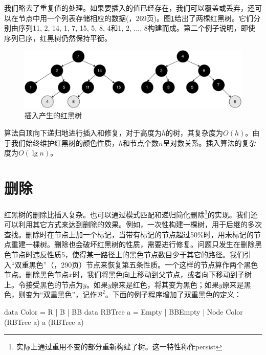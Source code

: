 \documentclass[b5paper]{ctexart}
\begin{document}
我们略去了重复值的处理。如果要插入的值已经存在，我们可以覆盖或丢弃，还可以在节点中用一个列表存储相应的数据(\cite{CLRS}，269页)。图\ref{fig:insert-example}给出了两棵红黑树。它们分别由序列11, 2, 14, 1, 7, 15, 5, 8, 4和1, 2, ..., 8构建而成。第二个例子说明，即使序列已序，红黑树仍然保持平衡。

\begin{figure}[htbp]
  \centering
  \includegraphics[scale=0.35]{img/insert-haskell}
  \caption{插入产生的红黑树}
  \label{fig:insert-example}
\end{figure}

算法自顶向下递归地进行插入和修复，对于高度为$h$的树，其复杂度为$O(h)$。由于我们始终维护红黑树的颜色性质，$h$和节点个数$n$呈对数关系。插入算法的复杂度为$O(\lg n)$。

\begin{Exercise}
\end{Exercise}

\section{删除}

红黑树的删除比插入复杂。也可以通过模式匹配和递归简化删除\footnote{实际上通过重用不变的部分重新构建了树。这一特性称作persist}的实现。我们还可以利用其它方式来达到删除的效果。例如，一次性构建一棵树，用于后继的多次查找\cite{okasaki-blog}。删除时在节点上加一个标记，当带有标记的节点超过50\%时，用未标记的节点重建一棵树。删除也会破坏红黑树的性质，需要进行修复。问题只发生在删除黑色节点时违反性质5，使得某一路径上的黑色节点数目少于其它的路径。我们引入“双重黑色”（\cite{CLRS}，290页）节点来恢复第五条性质。一个这样的节点算作两个黑色节点。删除黑色节点$x$时，我们将黑色向上移动到父节点，或者向下移动到子树上。令接受黑色的节点为$y$。如果$y$原来是红色，将其变为黑色；如果$y$原来是黑色，则变为“双重黑色”，记作$\mathcal{B}^2$。下面的例子程序增加了双重黑色的定义：

\begin{Haskell}
data Color = R | B | BB
data RBTree a = Empty | BBEmpty | Node Color (RBTree a) a (RBTree a)
\end{Haskell}
\end{document}
